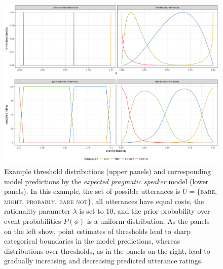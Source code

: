 \documentclass[lucida,biblatex]{sp} %
\begin{document}
\begin{figure}
\includegraphics[width=\textwidth]{plots/model-visualization-distributions.pdf}

\includegraphics[width=\textwidth]{plots/model-visualization-predictions.pdf}

\caption{Example threshold distributions (upper panels) and corresponding model predictions by the \textit{expected pragmatic speaker} model (lower panels). In this example, the set of possible utterances is $U=\{$\textsc{bare}, \textsc{might}, \textsc{probably}, \textsc{bare not}$\}$, all utterances have equal costs, the rationality parameter $\lambda$ is set to 10, and the prior probability over event probabilities $P(\phi)$ is a uniform distribution. As the panels on the left show, point estimates of thresholds lead to sharp categorical boundaries in the model predictions, whereas distributions over thresholds, as in the panels on the right, lead to gradually increasing and decreasing predicted utterance ratings. \label{fig:model-visualization}}
\end{figure}
\end{document}
